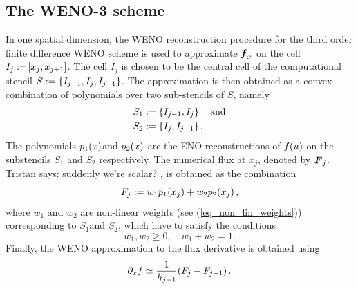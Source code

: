 \documentclass[final]{amsart}
\renewcommand{\vect}[1]{\geovec{#1}}
\renewcommand{\vec}[1]{\geovec{#1}}
\newcommand{\tristan}[1]{{\color{purple} Tristan says:  #1 }}
\numberwithin{equation}{section}
\begin{document}
\subsection{The WENO-3 scheme}
\label{subsec:WENO-3}
In one spatial dimension, the WENO reconstruction procedure for the
third order finite difference WENO scheme is used to approximate
$\vect f_x$ on the cell $I_j:=\!\left[{x_j, x_{j+1}}\right]$.  The cell $I_j$ is
chosen to be the central cell of the computational stencil
$S:=\left\lbrace I_{j-1}, I_j, I_{j+1}\right\rbrace$.  The approximation is then
obtained as a convex combination of polynomials over two sub-stencils
of $S$, namely
\begin{equation}
\begin{aligned}
S_1&:=\left\lbrace I_{j-1}, I_j\right\rbrace\quad \text{and}\\
S_2&:=\left\lbrace I_{j}, I_{j+1}\right\rbrace.
\end{aligned}
\end{equation}
The polynomials $p_1\!\left({x}\right)$and $p_2\!\left({x}\right)$ are the ENO reconstructions
of $f\!\left({u}\right)$ on the substencils $S_1$ and $S_2$ respectively.  The
numerical flux at $x_{j}$, denoted by $\vec F_{j}$.  \tristan{suddenly we're
  scalar?}, is obtained as the combination
\begin{equation}\label{eq_f_WENO}
F_{j}:=w_1p_1\!\left({x_{j}}\right) +w_2p_2\!\left({x_{j}}\right),
\end{equation}
where $w_1$ and $w_2$ are non-linear weights (see
(\ref{eq_non_lin_weights})) corresponding to $S_1$and $S_2$, which
have to satisfy the conditions
\begin{equation}
w_1, w_2\geq 0,\quad w_1 + w_2 = 1.
\end{equation}
Finally, the WENO approximation to the flux derivative is obtained using
\begin{equation}\label{eq_WENO_approx_flux_derivative}
\partial_x f\simeq \frac{1}{h_{j-1}}\!\left({F_{j}- F_{j-1}}\right).
\end{equation}
\end{document}
